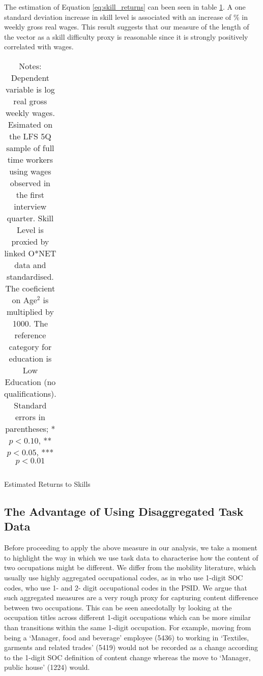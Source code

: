 \documentclass[12pt,authoryear]{elsarticle}
\begin{document}
	\vspace{2mm}
	
	The estimation of Equation \ref{eq:skill_returns} can been seen in table \ref{skill_returns}. A one standard deviation increase in skill level is associated with an increase of \hspace{-1mm}\% in weekly gross real wages. This result suggests that our measure of the length of the vector as a skill difficulty proxy is reasonable since it is strongly positively correlated with wages. 
	
	
	\begin{table}[t]
		\centering
		\begin{tabular}{l*{1}{c}}
			
		\end{tabular}
		\caption{Estimated Returns to Skills} 
		\caption*{\footnotesize Notes: Dependent variable is log real gross weekly wages. Esimated on the LFS 5Q sample of full time workers using wages observed in the first interview quarter. Skill Level is proxied by linked O*NET data and standardised. The coeficient on Age$^2$ is multiplied by 1000. The reference category for education is Low Education (no qualifications). Standard errors in parentheses;	* \(p<0.10\), ** \(p<0.05\), *** \(p<0.01\)}
		\label{skill_returns}
	\end{table}
	
	
	
	
	
	\subsection{The Advantage of Using  Disaggregated Task Data}
	\label{sec:advantageTasks}
	Before proceeding to apply the above measure in our analysis, we take a moment to highlight the way in which we use task data to characterise how the content of two occupations might be different. We differ from the mobility literature, which usually use highly aggregated occupational codes, as in \cite{Carrillo-Tudela2016} who use 1-digit SOC codes, \cite{kambourov2009occupational} who use 1- and 2- digit occupational codes in the PSID. We argue that such aggregated measures are a very rough proxy for capturing content difference between two occupations. This can be seen anecdotally by looking at the occupation titles across different 1-digit occupations which can be more similar than transitions within the same 1-digit occupation. For example, moving from being a `Manager, food and beverage' employee (5436) to working in `Textiles, garments and related trades' (5419) would not be recorded as a change according to the 1-digit SOC definition of content change whereas the move to `Manager, public house' (1224) would. 
	
\end{document}
